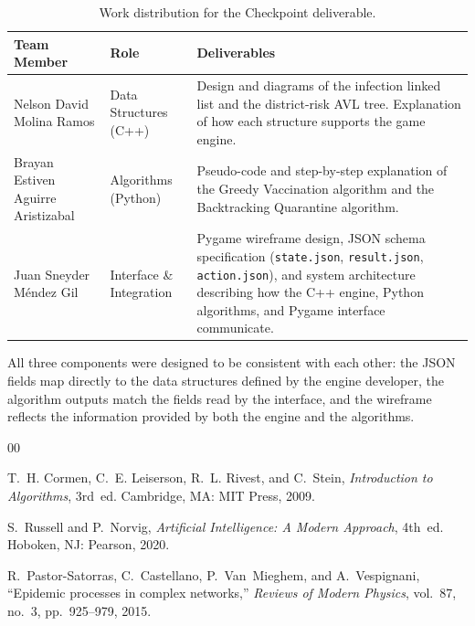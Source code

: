\documentclass[conference]{IEEEtran}
\begin{document}
\begin{table}[ht]
\centering
\caption{Work distribution for the Checkpoint deliverable.}
\label{tab:workdist}
\begin{tabular}{|p{3.0cm}|p{1.2cm}|p{3.5cm}|}
\hline
\textbf{Team Member} & \textbf{Role} & \textbf{Deliverables} \\
\hline
Nelson David Molina Ramos &
Data Structures (C++) &
Design and diagrams of the infection linked list and the district-risk AVL
tree. Explanation of how each structure supports the game engine. \\
\hline
Brayan Estiven Aguirre Aristizabal &
Algorithms (Python) &
Pseudo-code and step-by-step explanation of the Greedy Vaccination algorithm
and the Backtracking Quarantine algorithm. \\
\hline
Juan Sneyder M\'{e}ndez Gil &
Interface \& Integration &
Pygame wireframe design, JSON schema specification
(\texttt{state.json}, \texttt{result.json}, \texttt{action.json}), and
system architecture describing how the C++ engine, Python algorithms, and
Pygame interface communicate. \\
\hline
\end{tabular}
\end{table}

All three components were designed to be consistent with each other: the JSON
fields map directly to the data structures defined by the engine developer, the
algorithm outputs match the fields read by the interface, and the wireframe
reflects the information provided by both the engine and the algorithms.



\begin{thebibliography}{00}

T.~H. Cormen, C.~E. Leiserson, R.~L. Rivest, and C.~Stein,
\textit{Introduction to Algorithms}, 3rd~ed.
Cambridge, MA: MIT Press, 2009.

S.~Russell and P.~Norvig,
\textit{Artificial Intelligence: A Modern Approach}, 4th~ed.
Hoboken, NJ: Pearson, 2020.

R.~Pastor-Satorras, C.~Castellano, P.~Van~Mieghem, and A.~Vespignani,
``Epidemic processes in complex networks,''
\textit{Reviews of Modern Physics}, vol.~87, no.~3, pp.~925--979, 2015.

\end{thebibliography}
\end{document}
